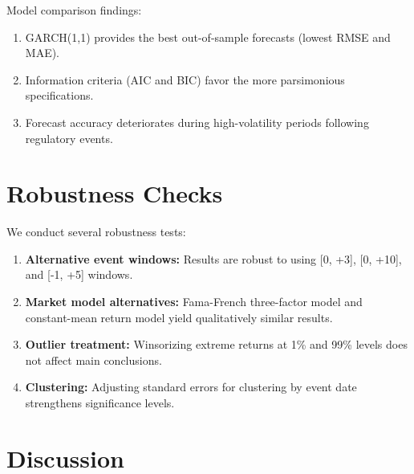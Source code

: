 \documentclass[12pt]{article}
\begin{document}
% 

Model comparison findings:

\begin{enumerate}
    \item GARCH(1,1) provides the best out-of-sample forecasts (lowest RMSE and MAE).

    \item Information criteria (AIC and BIC) favor the more parsimonious specifications.

    \item Forecast accuracy deteriorates during high-volatility periods following regulatory events.
\end{enumerate}


\section{Robustness Checks}

We conduct several robustness tests:

\begin{enumerate}
    \item \textbf{Alternative event windows:} Results are robust to using [0, +3], [0, +10], and [-1, +5] windows.

    \item \textbf{Market model alternatives:} Fama-French three-factor model and constant-mean return model yield qualitatively similar results.

    \item \textbf{Outlier treatment:} Winsorizing extreme returns at 1\% and 99\% levels does not affect main conclusions.

    \item \textbf{Clustering:} Adjusting standard errors for clustering by event date strengthens significance levels.
\end{enumerate}


\section{Discussion}
\end{document}
